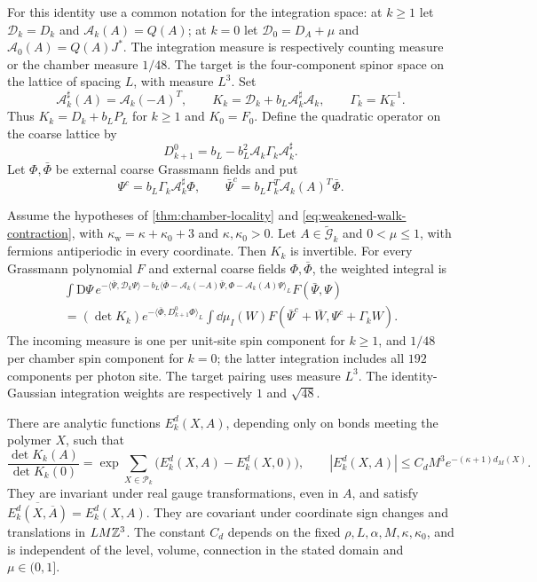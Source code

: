 For this identity use a common notation for the integration space:
at $k\ge1$ let $\mathcal D_k=D_k$ and
$\mathcal A_k(A)=Q(A)$; at $k=0$ let
$\mathcal D_0=D_A+\mu$ and $\mathcal A_0(A)=Q(A)J^*$.
The integration measure is respectively counting measure or the
chamber measure $1/48$. The target is the four-component spinor
space on the lattice of spacing $L$, with measure $L^3$.
Set
\[
 \mathcal A_k^\sharp(A)=\mathcal A_k(-A)^T,\qquad
 K_k=\mathcal D_k+b_L\mathcal A_k^\sharp\mathcal A_k,
 \qquad\Gamma_k=K_k^{-1}.
\]
Thus $K_k=D_k+b_LP_L$ for $k\ge1$ and $K_0=F_0$.
Define the quadratic operator on the coarse lattice by
\[
 D_{k+1}^0=b_L-b_L^2\mathcal A_k\Gamma_k
                                       \mathcal A_k^\sharp.
\]
Let $\Phi,\bar\Phi$ be external coarse Grassmann fields and put
\[
 \Psi^c=b_L\Gamma_k\mathcal A_k^\sharp\Phi,\qquad
 \bar\Psi^c=b_L\Gamma_k^T\mathcal A_k(A)^T\bar\Phi.
\]
\begin{theorem}\label{thm:fermion-block-integration}
Assume the hypotheses of \cref{thm:chamber-locality} and
\eqref{eq:weakened-walk-contraction}, with
$\kappa_{\mathrm w}=\kappa+\kappa_0+3$ and $\kappa,\kappa_0>0$.
Let $A\in\widetilde{\mathcal G}_k$ and $0<\mu\le1$, with fermions
antiperiodic in every coordinate. Then $K_k$ is invertible.
For every Grassmann polynomial $F$ and external coarse fields
$\Phi,\bar\Phi$, the weighted integral is
\begin{multline}\label{eq:Gaussian-block-integration}
 \int\mathrm D\Psi\,
 e^{-\langle\bar\Psi,\mathcal D_k\Psi\rangle
 -b_L\langle\bar\Phi-\mathcal A_k(-A)\bar\Psi,
                  \Phi-\mathcal A_k(A)\Psi\rangle_L}
 F(\bar\Psi,\Psi)\\
 =(\det K_k)e^{-\langle\bar\Phi,D_{k+1}^0\Phi\rangle_L}
 \int\dd\mu_I(W)
 F(\bar\Psi^c+\bar W,\Psi^c+\Gamma_kW).
\end{multline}
The incoming measure is one per unit-site spin component for $k\ge1$,
and $1/48$ per chamber spin component for $k=0$; the latter
integration includes all $192$ components per photon site.
The target pairing uses measure $L^3$. The identity-Gaussian
integration weights are respectively $1$ and $\sqrt{48}$.

There are analytic functions $E_k^d(X,A)$, depending only on bonds
meeting the polymer $X$, such that
\begin{equation}\label{eq:main-determinant-quotient}
 \frac{\det K_k(A)}{\det K_k(0)}
   =\exp\sum_{X\in\mathcal P_k}
           \bigl(E_k^d(X,A)-E_k^d(X,0)\bigr),\qquad
 |E_k^d(X,A)|\le C_dM^3e^{-(\kappa+1)d_M(X)}.
\end{equation}
They are invariant under real gauge transformations, even in $A$,
and satisfy
$\overline{E_k^d(X,\overline A)}=E_k^d(X,A)$.
They are covariant under coordinate sign changes and translations
in $LM\mathbb Z^3$. The constant $C_d$ depends on the fixed
$\rho,L,\alpha,M,\kappa,\kappa_0$, and is independent of the level,
volume, connection in the stated domain and $\mu\in(0,1]$.
\end{theorem}


